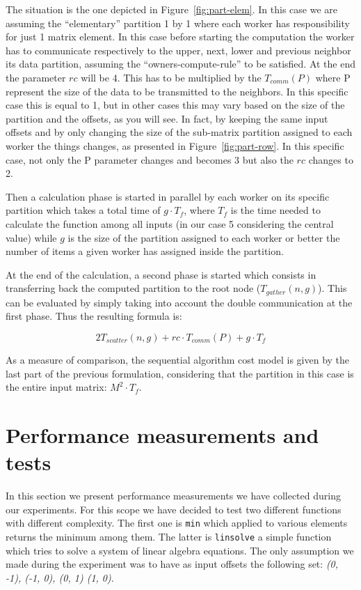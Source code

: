 The situation is the one depicted in Figure~\ref{fig:part-elem}. In this
case we are assuming the ``elementary'' partition 1 by 1 where each
worker has responsibility for just 1 matrix element. In this case before
starting the computation the worker has to communicate respectively to
the upper, next, lower and previous neighbor its data partition,
assuming the “owners-compute-rule” to be satisfied. At the end the
parameter $rc$ will be 4. This has to be multiplied by the $T_{comm}(P)$
where P represent the size of the data to be transmitted to the
neighbors. In this specific case this is equal to 1, but in other cases
this may vary based on the size of the partition and the offsets, as you
will see. In fact, by keeping the same input offsets and by only
changing the size of the sub-matrix partition assigned to each worker
the things changes, as presented in Figure~\ref{fig:part-row}. In this
specific case, not only the P parameter changes and becomes 3 but also
the $rc$ changes to 2.

Then a calculation phase is started in parallel by each worker on its
specific partition which takes a total time of $g \cdot T_{f}$, where
$T_{f}$ is the time needed to calculate the function among all inputs
(in our case 5 considering the central value) while $g$ is the size of the
partition assigned to each worker or better the number of items a given
worker has assigned inside the partition.

At the end of the calculation, a second phase is started which consists
in transferring back the computed partition to the root node
($T_{gather}(n,g)$). This can be evaluated by simply taking into account
the double communication at the first phase. Thus the resulting formula
is:

$$
2 T_{scatter}(n,g) + rc \cdot T_{comm}(P) + g \cdot T_{f}
$$

As a measure of comparison, the sequential algorithm cost model is given
by the last part of the previous formulation, considering that the
partition in this case is the entire input matrix: $M^{2} \cdot T_{f}$.

\section{Performance measurements and tests}


In this section we present performance measurements we have collected
during our experiments. For this scope we have decided to test two
different functions with different complexity. The first one is
\texttt{min} which applied to various elements returns the minimum among
them. The latter is \texttt{linsolve} a simple function which tries to
solve a system of linear algebra equations. The only assumption we made
during the experiment was to have as input offsets the following set:
\emph{(0, -1), (-1, 0), (0, 1) (1, 0)}.

